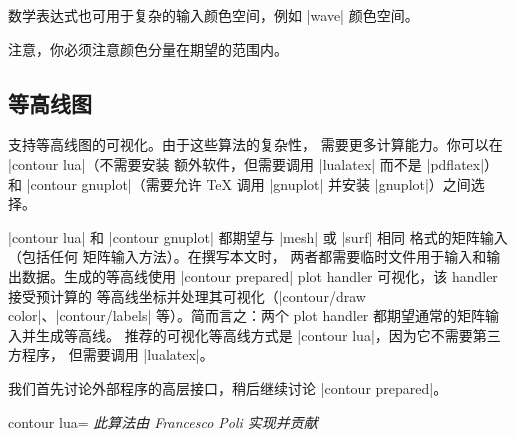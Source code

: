{{数学表达式也可用于复杂的输入颜色空间，例如 |wave| 颜色空间。
%
\begin{codeexample}[]
\end{codeexample}

注意，你必须注意颜色分量在期望的范围内。
}%


\subsection{等高线图}
{
%
%
%
\PGFPlots{} 支持等高线图的可视化。由于这些算法的复杂性，
\PGFPlots{} 需要更多计算能力。你可以在 |contour lua|（不需要安装
额外软件，但需要调用 |lualatex| 而不是 |pdflatex|）和
|contour gnuplot|（需要允许 \TeX{} 调用 |gnuplot| 并安装
|gnuplot|）之间选择。

|contour lua| 和 |contour gnuplot| 都期望与 |mesh| 或 |surf| 相同
格式的矩阵输入（包括任何 \PGFPlots{} 矩阵输入方法）。在撰写本文时，
两者都需要临时文件用于输入和输出数据。生成的等高线使用
|contour prepared| plot handler 可视化，该 handler 接受预计算的
等高线坐标并处理其可视化（|contour/draw color|、|contour/labels|
等）。简而言之：两个 plot handler 都期望通常的矩阵输入并生成等高线。
推荐的可视化等高线方式是 |contour lua|，因为它不需要第三方程序，
但需要调用 |lualatex|。

我们首先讨论外部程序的高层接口，稍后继续讨论 |contour prepared|。

\begin{plottype}[/pgfplots]{
    contour lua=\textcolor{black}{}%
}
{\emph{此算法由 Francesco Poli 实现并贡献}}


\end{plottype}}}
